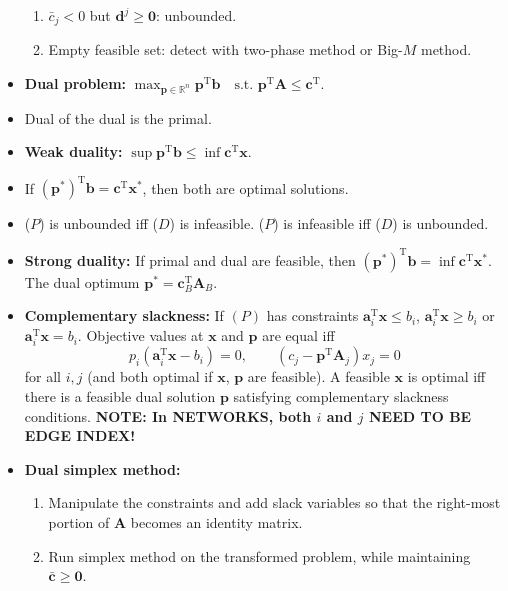 \documentclass[10pt]{article}
\begin{document}
\begin{multicols*}{3}
\begin{itemize}
\begin{enumerate}
                \item $\bar{c}_j < 0$ but $\bm{d}^j \geq \mathbf{0}$: unbounded.
                \item Empty feasible set: detect with two-phase method or Big-$M$ method.
            \end{enumerate} 
            \item \textbf{Dual problem:} $\max_{\bm{p} \in \mathbb{R}^n} \bm{p}^{\mathrm{T}}\bm{b} \quad \textrm{s.t. } \bm{p}^{\mathrm{T}}\bm{A} \leq \bm{c}^{\mathrm{T}}$.
            \item Dual of the dual is the primal.
            \item \textbf{Weak duality:} $\sup \bm{p}^{\mathrm{T}}\bm{b} \leq \inf \bm{c}^{\mathrm{T}}\bm{x}$.
            \item If $(\bm{p}^*)^{\mathrm{T}}\bm{b} = \bm{c}^{\mathrm{T}}\bm{x}^*$, then both are optimal solutions.
            \item ($P$) is unbounded iff ($D$) is infeasible. ($P$) is infeasible iff ($D$) is unbounded.
            \item \textbf{Strong duality:} If primal and dual are feasible, then $(\bm{p}^*)^{\mathrm{T}}\bm{b} = \inf \bm{c}^{\mathrm{T}}\bm{x}^*$. The dual optimum $\bm{p}^* = \bm{c}^{\mathrm{T}}_B\bm{A}_B$.
            \item \textbf{Complementary slackness:} If $(P)$ has constraints $\bm{a}_i^{\mathrm{T}}\bm{x} \leq b_i$, $\bm{a}_i^{\mathrm{T}}\bm{x} \geq b_i$ or $\bm{a}_i^{\mathrm{T}}\bm{x} = b_i$. Objective values at $\bm{x}$ and $\bm{p}$ are equal iff 
            \begin{equation*}
                p_i\left(\bm{a}_i^{\mathrm{T}}\bm{x} - b_i\right) = 0, \qquad \left(c_j - \bm{p}^{\mathrm{T}}\bm{A}_j\right)x_j = 0
            \end{equation*}
            for all $i, j$ (and both optimal if $\bm{x}$, $\bm{p}$ are feasible). A feasible $\bm{x}$ is optimal iff there is a feasible dual solution $\bm{p}$ satisfying complementary slackness conditions. \textbf{NOTE: In NETWORKS, both $i$ and $j$ NEED TO BE EDGE INDEX!}
            \item \textbf{Dual simplex method:}
            \begin{enumerate}
                \item Manipulate the constraints and add slack variables so that the right-most portion of $\bm{A}$ becomes an identity matrix.
                \item Run simplex method on the transformed problem, while maintaining $\bar{\bm{c}} \geq \mathbf{0}$.

\end{enumerate}
\end{itemize}
\end{multicols*}
\end{document}
